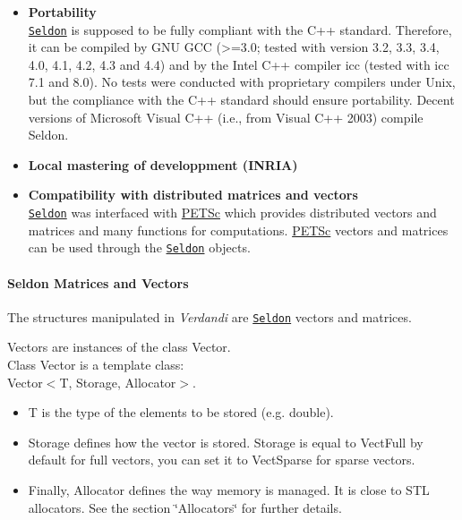 \documentclass{tufte-book}
\begin{document}
\begin{itemize}
\begin{itemize}
\item \textbf{Portability}\\
\href{http://seldon.sourceforge.net/}{\tt \-Seldon} is supposed to be fully compliant with the C++ standard. Therefore, it can be compiled by GNU GCC (>=3.0; tested with version 3.2, 3.3, 3.4, 4.0, 4.1, 4.2, 4.3 and 4.4) and by the Intel C++ compiler icc (tested with icc 7.1 and 8.0). No tests were conducted with proprietary compilers under Unix, but the compliance with the C++ standard should ensure portability. Decent versions of Microsoft Visual C++ (i.e., from Visual C++ 2003) compile Seldon.

\item \textbf{Local mastering of developpment (INRIA)}\\

\item \textbf{Compatibility with distributed matrices and vectors}\\
\href{http://seldon.sourceforge.net/}{\tt \-Seldon} was interfaced with \href{http://www.mcs.anl.gov/petsc/}{PETSc} which provides distributed vectors and matrices and many functions for computations. \href{http://www.mcs.anl.gov/petsc/}{PETSc} vectors and matrices can be used through the \href{http://seldon.sourceforge.net/}{\tt \-Seldon} objects.

\end{itemize}

\hypertarget{tips_matrix_vector}{}\paragraph{\-Seldon Matrices and Vectors}\label{tips_matrix_vector}


\-The structures manipulated in \-\emph{Verdandi} are \href{http://seldon.sourceforge.net/}{\tt \-Seldon} vectors and matrices.

\-Vectors are instances of the class {\ttfamily \-Vector}.\\
\-Class {\ttfamily \-Vector} is a template class\-:\\
{\ttfamily \-Vector$<$\-T, Storage, Allocator$>$}.
\begin{itemize}
\item{\ttfamily \-T} is the type of the elements to be stored (e.\-g. {\ttfamily double}).
\item {\ttfamily \-Storage} defines how the vector is stored. {\ttfamily \-Storage} is equal to {\ttfamily \-Vect\-Full} by default for full vectors, you can set it to {\ttfamily \-Vect\-Sparse} for sparse vectors.
\item \-Finally, {\ttfamily \-Allocator} defines the way memory is managed. \-It is close to \-S\-T\-L allocators. \-See the section \char`\"{}\-Allocators\char`\"{} for further details.


\end{itemize}
\end{itemize}
\end{document}
